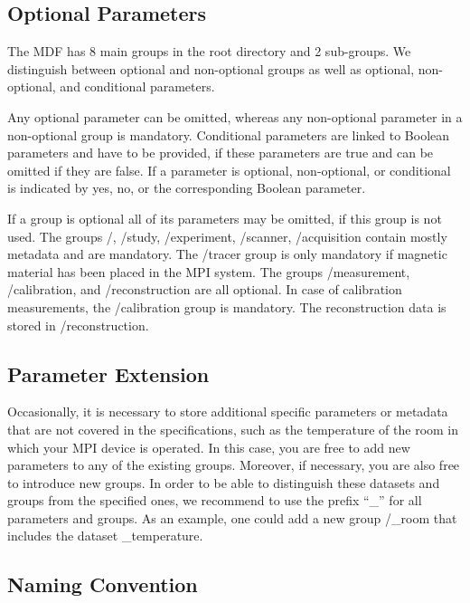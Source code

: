 \documentclass[landscape,a4paper]{article} %
\newcommand{\inlvar}[1]{{\ttfamily#1}}
\begin{document}
\begin{multicols}{2}
\subsection{Optional Parameters}

The MDF has 8 main groups in the root directory and 2 sub-groups. We distinguish between optional and non-optional groups as well as optional, non-optional, and conditional parameters. 

Any optional parameter can be omitted, whereas any non-optional parameter in a non-optional group is mandatory. Conditional parameters are linked to Boolean parameters and have to be provided, if these parameters are true and can be omitted if they are false. If a parameter is optional, non-optional, or conditional is indicated by yes, no, or the corresponding Boolean parameter.

If a group is optional all of its parameters may be omitted, if this group is not used. The groups \inlvar{/}, \inlvar{/study}, \inlvar{/experiment}, \inlvar{/scanner}, \inlvar{/acquisition} contain mostly metadata and are mandatory. The \inlvar{/tracer} group is only mandatory if magnetic material has been placed in the MPI system. The groups \inlvar{/measurement}, \inlvar{/calibration}, and \inlvar{/reconstruction} are all optional. In case of calibration measurements, the \inlvar{/calibration} group is mandatory. The reconstruction data is stored in \inlvar{/reconstruction}. 

\subsection{Parameter Extension}

Occasionally, it is necessary to store additional specific parameters or metadata that are not covered in the specifications, such as the temperature of the room in which your MPI device is operated. In this case, you are free to add new parameters to any of the existing groups. Moreover, if necessary, you are also free to introduce new groups. In order to be able to distinguish these datasets and groups from the specified ones, we recommend to use the prefix ``\inlvar{\_}'' for all parameters and groups. As an example, one could add a new group \inlvar{/\_room} that includes the dataset \inlvar{\_temperature}.

\subsection{Naming Convention}


\end{multicols}
\end{document}
